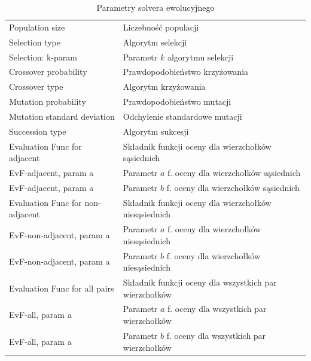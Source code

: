 \documentclass[a4paper,onecolumn,oneside,12pt]{mwart}
\begin{document}
\begin{table}[h!]
	\centering
	\begin{tabular}{p{}p{}}
		\hline
Population size & Liczebność populacji \\
Selection type & Algorytm selekcji \\
Selection: k-param & Parametr $k$ algorytmu selekcji \\
Crossover probability & Prawdopodobieństwo krzyżowania \\
Crossover type & Algorytm krzyżowania \\
Mutation probability & Prawdopodobieństwo mutacji \\
Mutation standard deviation & Odchylenie standardowe mutacji \\
Succession type & Algorytm sukcesji \\
Evaluation Func for adjacent & Składnik funkcji oceny dla wierzchołków sąsiednich \\
EvF-adjacent, param a & Parametr $a$ f. oceny dla wierzchołków sąsiednich \\
EvF-adjacent, param a & Parametr $b$ f. oceny dla wierzchołków sąsiednich \\
Evaluation Func for non-adjacent & Składnik funkcji oceny dla wierzchołków niesąsiednich \\
EvF-non-adjacent, param a & Parametr $a$ f. oceny dla wierzchołków niesąsiednich \\
EvF-non-adjacent, param a & Parametr $b$ f. oceny dla wierzchołków niesąsiednich \\
Evaluation Func for all pairs & Składnik funkcji oceny dla wszystkich par wierzchołków \\
EvF-all, param a & Parametr $a$ f. oceny dla wszystkich par wierzchołków \\
EvF-all, param a & Parametr $b$ f. oceny dla wszystkich par wierzchołków \\
		\hline
	\end{tabular}
	\caption{Parametry solvera ewolucyjnego}
	\label{tab:params-solver-evo}
\end{table}
\end{document}
